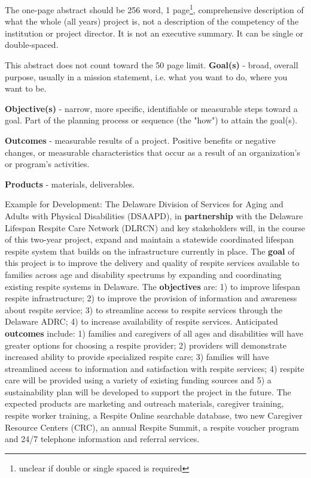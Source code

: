 The one-page abstract should be 256 word, 1 page\footnote{unclear if double or single spaced is required}, comprehensive description of what the whole (all years)
project is, not a description of the competency of the institution or project director. It is not an executive summary. It can be single or double-spaced.

This abstract does not count toward the 50 page limit. 
\textbf{Goal(s)} - broad, overall purpose, usually in a mission statement, i.e. what you want to do, where you want to be.

\textbf{Objective(s)} - narrow, more specific, identifiable or measurable steps toward a goal. Part of the planning process or sequence (the "how") to attain the goal(s).

\textbf{Outcomes} - measurable results of a project. Positive benefits or negative changes, or measurable characteristics that occur as a result of an organization's or program's activities. 

\textbf{Products} - materials, deliverables.

Example for Development: The Delaware Division of Services for Aging and Adults with Physical Disabilities (DSAAPD), in \textbf{partnership} with the Delaware Lifespan Respite Care Network (DLRCN) and key stakeholders will, in the course of this two-year project, expand and maintain a statewide coordinated lifespan respite system that builds on the infrastructure currently in place.
The \textbf{goal} of this project is to improve the delivery and quality of respite services available to families across age and disability spectrums by expanding and coordinating existing respite systems in Delaware. The \textbf{objectives} are: 1) to improve lifespan respite infrastructure; 2) to improve the provision of information and awareness about respite service; 3) to streamline access to respite services through the Delaware ADRC; 4) to increase availability of respite services. Anticipated \textbf{outcomes} include: 1) families and caregivers of all ages and disabilities will have greater options for choosing a respite provider; 2) providers will demonstrate increased ability to provide specialized respite care; 3) families will have streamlined access to
information and satisfaction with respite services; 4) respite care will be provided using a variety of existing funding sources and 5) a sustainability plan will be developed to support the project in the future. The expected products are marketing and outreach materials, caregiver training, respite worker training, a Respite Online searchable database, two new Caregiver Resource Centers (CRC), an annual Respite Summit, a respite voucher program and 24/7 telephone information and referral services.